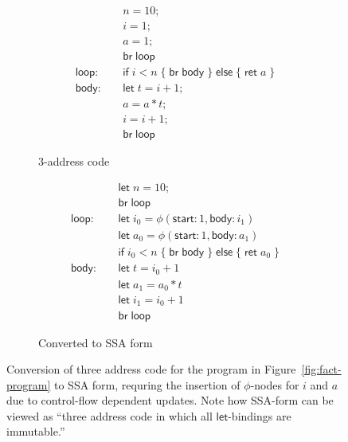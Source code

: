 \documentclass[acmsmall,screen,review]{acmart}
\newcommand{\ms}[1]{\ensuremath{\mathsf{#1}}}
\begin{document}
\begin{figure}
  \begin{subfigure}[t]{.5\textwidth}
    \begin{align*}
                        & n = 10; \\
                        & i = 1; \\
                        & a = 1; \\
                        & \ms{br}\;\ms{loop} \\
      \ms{loop}: \quad  & \ms{if}\;i < n\;
                          \{\;\ms{br}\;\ms{body}\;\}\;
                          \ms{else}\;\{\;\ms{ret}\;a\;\} \\
      \ms{body}: \quad  & \ms{let}\;t = i + 1; \\
                        & a = a * t; \\
                        & i = i + 1; \\
                        & \ms{br}\;\ms{loop}
    \end{align*}
    \caption{3-address code}
  \end{subfigure}%
  \begin{subfigure}[t]{.5\textwidth}
    \begin{align*}
                        & \ms{let}\;n = 10; \\
                        & \ms{br}\;\ms{loop} \\
      \ms{loop}: \quad  & \ms{let}\;i_0 = \phi(\ms{start}: 1, \ms{body}: i_1) \\
                        & \ms{let}\;a_0 = \phi(\ms{start}: 1, \ms{body}: a_1) \\
                        & \ms{if}\;i_0 < n\;
                          \{\;\ms{br}\;\ms{body}\;\}\;
                          \ms{else}\;\{\;\ms{ret}\;a_0\;\} \\
      \ms{body}: \quad  & \ms{let}\;t = i_0 + 1 \\
                        & \ms{let}\;a_1 = a_0 * t \\
                        & \ms{let}\;i_1 = i_0 + 1 \\
                        & \ms{br}\;\ms{loop}
    \end{align*}
    \caption{Converted to SSA form}
    \label{fig:fact-ssa}
  \end{subfigure}
  \caption{
    Conversion of three address code for the program in Figure~\ref{fig:fact-program} to SSA 
    form, requring the insertion of $\phi$-nodes for $i$ and $a$ due to control-flow dependent
    updates. Note how SSA-form can be viewed as ``three address code in which all 
    \ms{let}-bindings are immutable.''
  }
  \Description{}
\end{figure}
 
\end{document}
